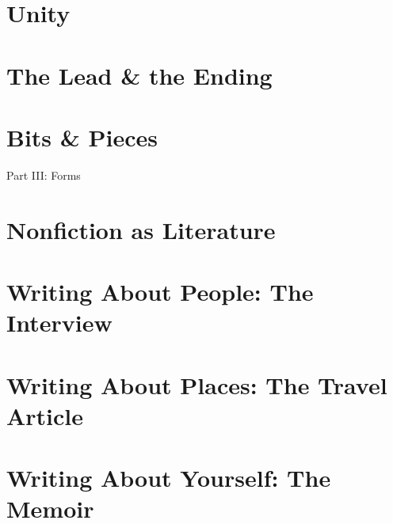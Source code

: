 \documentclass{article}
\begin{document}

\section{Unity}


\section{The Lead \& the Ending}


\section{Bits \& Pieces}


\begin{center}\huge
	Part III: Forms
\end{center}


\section{Nonfiction as Literature}


\section{Writing About People: The Interview}


\section{Writing About Places: The Travel Article}


\section{Writing About Yourself: The Memoir}
\end{document}
